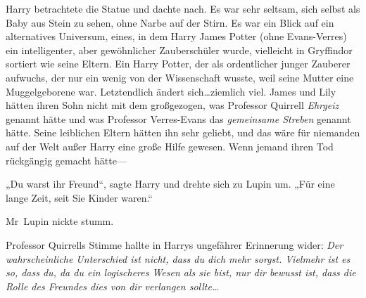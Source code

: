 Harry betrachtete die Statue und dachte nach. Es war sehr seltsam, sich selbst als Baby aus Stein zu sehen, ohne Narbe auf der Stirn. Es war ein Blick auf ein alternatives Universum, eines, in dem Harry James Potter (ohne Evans-Verres) ein intelligenter, aber gewöhnlicher Zauberschüler wurde, vielleicht in Gryffindor sortiert wie seine Eltern. Ein Harry Potter, der als ordentlicher junger Zauberer aufwuchs, der nur ein wenig von der Wissenschaft wusste, weil seine Mutter eine Muggelgeborene war. Letztendlich ändert sich…ziemlich viel. James und Lily hätten ihren Sohn nicht mit dem großgezogen, was Professor Quirrell \emph{Ehrgeiz} genannt hätte und was Professor Verres-Evans das \emph{gemeinsame Streben} genannt hätte. Seine leiblichen Eltern hätten ihn sehr geliebt, und das wäre für niemanden auf der Welt außer Harry eine große Hilfe gewesen. Wenn jemand ihren Tod rückgängig gemacht hätte—

„Du warst ihr Freund“, sagte Harry und drehte sich zu Lupin um. „Für eine lange Zeit, seit Sie Kinder waren.“

Mr~Lupin nickte stumm.

Professor Quirrells Stimme hallte in Harrys ungefährer Erinnerung wider: \emph{Der wahrscheinliche Unterschied ist nicht, dass du dich mehr sorgst. Vielmehr ist es so, dass du, da du ein logischeres Wesen als sie bist, nur dir bewusst ist, dass die Rolle des Freundes dies von dir verlangen sollte…}

